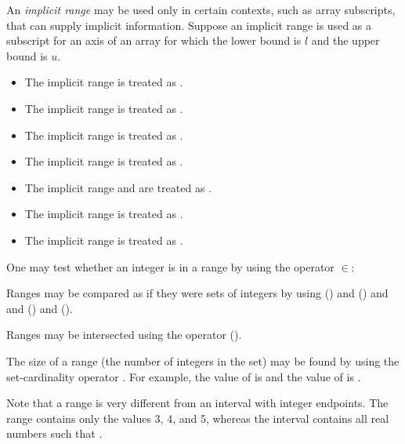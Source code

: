 An \emph{implicit range} may be used only in certain contexts, such as array subscripts,
that can supply implicit information.  Suppose an implicit range is used as a subscript
for an axis of an array for which the lower bound is $l$ and the upper bound is $u$.
\begin{itemize}
\item The implicit range \EXP{\COLONOP} is treated as .
\item The implicit range  is
  treated as .
\item The implicit range  is treated as .
\item The implicit range  is treated as
.
\item The implicit range  and  are treated as .
\item The implicit range  is treated as
.
\item The implicit range  is treated as .
\end{itemize}

One may test whether an integer is in a range by using the operator $\in$:


Ranges may be compared as if they were sets of integers by using
\EXP{\subset} () and \EXP{\subseteq} ()
and \EXP{=} and \EXP{\supseteq} () and \EXP{\supset} ().

Ranges may be intersected using the operator \EXP{\cap} ().

The size of a range (the number of integers in the set)
may be found by using the set-cardinality operator
\EXP{\left|\ldots\right|}.  For example, the value of \EXP{\left|3\COLONOP{}7\right|} is 
and the value of \EXP{\left|1\COLONOP{}100\COLONOP{}2\right|} is .

Note that a range is very different from an interval with integer endpoints.
The range  contains only the values 3, 4, and 5,
whereas the interval \EXP{[3,5]} contains all real numbers  such that .
